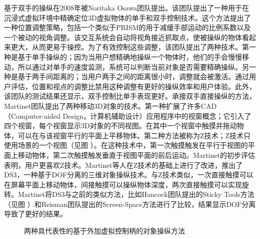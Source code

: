 基于双手的操纵在2008年被Noritaka Osawa团队提出。该团队提出了一种用于在沉浸式虚拟环境中精确定位3D虚拟物体的单手和双手控制技术。这个方法提出了一种位置调整策略，包括一个类似于PRISM的用于减缓手部运动的比例系数以及一个被动的视角调整。该交互系统会自动将视角接近抓取点，使被操纵的物体看起来更大，从而更易于操控。为了有效控制这些调整，该团队提出了两种技术。第一种是基于单手操纵的；因为当用户想精确地操纵一个物体时，他们的手会慢慢移动，所以通过对单手的速度监测，系统可以判断当前对象是否需要精确操纵。另一种是基于两手间距离的；当用户两手之间的距离很小时，调整就会被激活。通过用户评估，位置和视点的调整比禁用这种调整有更好的操纵效率和用户体验。此外，该团队的测试结果还显示，双手控制比单手表现更好。承接双手直接操纵的方法，Martinet团队提出了两种移动3D对象的技术。第一种扩展了许多CAD（Computer-aided Design，计算机辅助设计）应用程序中的视窗概念；它引入了四个视窗，每个视窗显示3D对象的不同视图。在其中一个视窗中触摸并拖动物体，可以在与该视窗平行的平面上平移物体。第二种方法被称为Z技术；Z技术只使用场景的一个视图（见图 ）。在这种技术中，第一次触摸触发在平行于视图的平面上移动物体，第二次触摸触发垂直于视图平面的前后运动。Martinet的初步评估表明，用户更喜欢Z技术。Martinet等人在Z技术的基础上进行了改进，推出了DS3，一种基于DOF分离的三维对象操纵技术。与Z技术类似，一次直接触摸可以在屏幕平面上移动物体，间接触摸可以操纵物体深度，两次直接触摸可以实现旋转。Martinet将DS3与之前的类似方法，比如Hancock团队提出的Sticky Tools方法（见图 ）和Reisman团队提出的Screen-Space方法进行了比较，结果显示DOF分离导致了更好的结果。

\begin{figure}[t!]
    \centering
    \hspace{0.2em} %
    \caption{两种具代表性的基于外加虚拟控制柄的对象操纵方法}
    \label{fig-4}
\end{figure}

